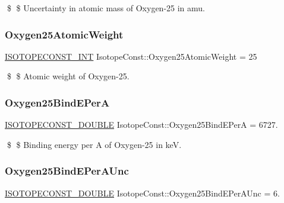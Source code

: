 \$ \$ Uncertainty in atomic mass of Oxygen-\/25 in amu. \mbox{\label{group___isotope_const-_oxygen-_o25_ga91117d7c9ebd65cfa9b37e60d6d3068d}} 
\subsubsection{\texorpdfstring{Oxygen25\+Atomic\+Weight}{Oxygen25AtomicWeight}}
{\footnotesize\ttfamily \mbox{\hyperlink{group___isotope_const-_macros_ga5f18360b3e99483a35c32d789e62621c}{I\+S\+O\+T\+O\+P\+E\+C\+O\+N\+S\+T\+\_\+\+I\+NT}} Isotope\+Const\+::\+Oxygen25\+Atomic\+Weight = 25}

\$ \$ Atomic weight of Oxygen-\/25. \mbox{\label{group___isotope_const-_oxygen-_o25_gaaf6bb978909e7a4d2e93f166ea33a21d}} 
\subsubsection{\texorpdfstring{Oxygen25\+Bind\+E\+PerA}{Oxygen25BindEPerA}}
{\footnotesize\ttfamily \mbox{\hyperlink{group___isotope_const-_macros_ga8f45a7272ce02c0b4c65c44636ed719a}{I\+S\+O\+T\+O\+P\+E\+C\+O\+N\+S\+T\+\_\+\+D\+O\+U\+B\+LE}} Isotope\+Const\+::\+Oxygen25\+Bind\+E\+PerA = 6727.}

\$ \$ Binding energy per A of Oxygen-\/25 in keV. \mbox{\label{group___isotope_const-_oxygen-_o25_gaeb61e14678ff2c21990f64a5794236f0}} 
\subsubsection{\texorpdfstring{Oxygen25\+Bind\+E\+Per\+A\+Unc}{Oxygen25BindEPerAUnc}}
{\footnotesize\ttfamily \mbox{\hyperlink{group___isotope_const-_macros_ga8f45a7272ce02c0b4c65c44636ed719a}{I\+S\+O\+T\+O\+P\+E\+C\+O\+N\+S\+T\+\_\+\+D\+O\+U\+B\+LE}} Isotope\+Const\+::\+Oxygen25\+Bind\+E\+Per\+A\+Unc = 6.}

